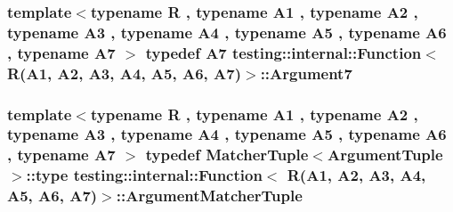 \subsubsection[{\texorpdfstring{Argument7}{Argument7}}]{\setlength{\rightskip}{0pt plus 5cm}template$<$typename R , typename A1 , typename A2 , typename A3 , typename A4 , typename A5 , typename A6 , typename A7 $>$ typedef A7 {\bf testing\+::internal\+::\+Function}$<$ R(A1, A2, A3, A4, A5, A6, A7)$>$\+::{\bf Argument7}}\hypertarget{structtesting_1_1internal_1_1Function_3_01R_07A1_00_01A2_00_01A3_00_01A4_00_01A5_00_01A6_00_01A7_08_4_a55fa91035fc3c9da4c6ab94060ca6f6f}{}\label{structtesting_1_1internal_1_1Function_3_01R_07A1_00_01A2_00_01A3_00_01A4_00_01A5_00_01A6_00_01A7_08_4_a55fa91035fc3c9da4c6ab94060ca6f6f}
\subsubsection[{\texorpdfstring{Argument\+Matcher\+Tuple}{ArgumentMatcherTuple}}]{\setlength{\rightskip}{0pt plus 5cm}template$<$typename R , typename A1 , typename A2 , typename A3 , typename A4 , typename A5 , typename A6 , typename A7 $>$ typedef {\bf Matcher\+Tuple}$<${\bf Argument\+Tuple}$>$\+::type {\bf testing\+::internal\+::\+Function}$<$ R(A1, A2, A3, A4, A5, A6, A7)$>$\+::{\bf Argument\+Matcher\+Tuple}}\hypertarget{structtesting_1_1internal_1_1Function_3_01R_07A1_00_01A2_00_01A3_00_01A4_00_01A5_00_01A6_00_01A7_08_4_a76b4296ad8b88922e997170875e9198d}{}\label{structtesting_1_1internal_1_1Function_3_01R_07A1_00_01A2_00_01A3_00_01A4_00_01A5_00_01A6_00_01A7_08_4_a76b4296ad8b88922e997170875e9198d}
